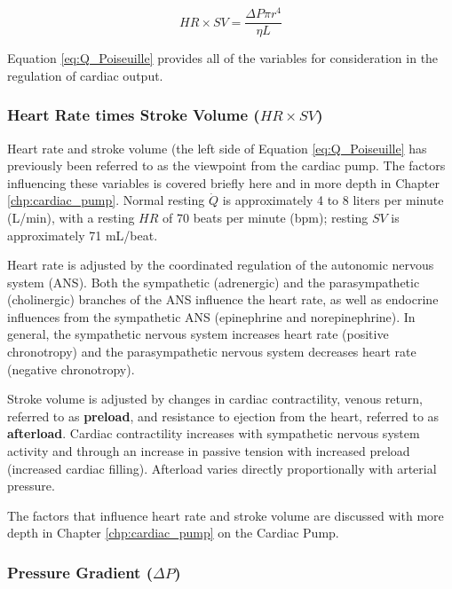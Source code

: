 \begin{equation}
    HR \times SV = \frac{\Delta P \pi r^4}{\eta L}
    \label{eq:Q_Poiseuille}
\end{equation}

Equation \ref{eq:Q_Poiseuille} provides all of the variables for consideration in the regulation of cardiac output. 

\subsubsection{Heart Rate times Stroke Volume ($HR \times SV$)}

Heart rate and stroke volume (the left side of Equation \ref{eq:Q_Poiseuille} has previously been referred to as the viewpoint from the cardiac pump. The factors influencing these variables is covered briefly here and in more depth in Chapter \ref{chp:cardiac_pump}. Normal resting $\dot{Q}$ is approximately 4 to 8 liters per minute (L/min), with a resting $HR$ of 70 beats per minute (bpm); resting $SV$ is approximately 71 mL/beat.

Heart rate is adjusted by the coordinated regulation of the autonomic nervous system (ANS). Both the sympathetic (adrenergic) and the parasympathetic (cholinergic) branches of the ANS influence the heart rate, as well as endocrine influences from the sympathetic ANS (epinephrine and norepinephrine). In general, the sympathetic nervous system increases heart rate (positive chronotropy) and the parasympathetic nervous system decreases heart rate (negative chronotropy). 

Stroke volume is adjusted by changes in cardiac contractility, venous return, referred to as \textbf{preload}, and resistance to ejection from the heart, referred to as \textbf{afterload}. Cardiac contractility increases with sympathetic nervous system activity and through an increase in passive tension with increased preload (increased cardiac filling). Afterload varies directly proportionally with arterial pressure. 

The factors that influence heart rate and stroke volume are discussed with more depth in Chapter \ref{chp:cardiac_pump} on the Cardiac Pump.


\subsubsection{Pressure Gradient ($\Delta P$)}

